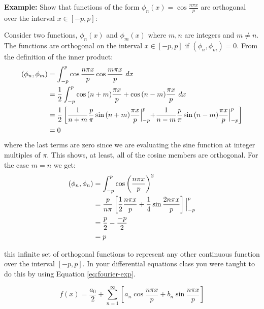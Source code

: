 \vspace{1.0cm}

\noindent\textbf{Example:} Show that functions of the form $\phi_n(x) = \cos{\frac{n\pi x}{p}}$ are orthogonal over the interval $x \in [-p,p]$:

\vspace{0.5cm}
\noindent Consider two functions, $\phi_n(x)$ and $\phi_m(x)$ where $m,n$ are integers and $m \ne n$.  The functions are orthogonal on the interval $x\in [-p,p]$ if $(\phi_n,\phi_m) = 0$.  From the definition of the inner product:
\begin{align*}
(\phi_n,\phi_m) &= \int_{-p}^{p} \cos{\frac{n \pi x}{p}} \cos{\frac{m \pi x}{p}} \ dx \\
&= \frac{1}{2}\int_{-p}^{p} \cos{(n+m)\frac{\pi x}{p}} + \cos{(n-m)\frac{\pi x}{p}} \ dx \\
&= \frac{1}{2} \left[\frac{1}{n+m} \frac{p}{\pi}\sin{(n+m)\frac{\pi x}{p}}\Bigl|_{-p}^{p} + \frac{1}{n-m}\frac{p}{\pi}\sin{(n-m)\frac{\pi x}{p}}\Bigl|_{-p}^{p} \right] \\
&=0
\end{align*}
where the last terms are zero since we are evaluating the sine function at integer multiples of $\pi$.  This shows, at least, all of the cosine members are orthogonal.  For the case $m=n$ we get:
\begin{align*}
\left(\phi_n,\phi_n \right) &= \int_{-p}^{p} \cos{\left(\frac{n \pi x}{p} \right)}^2 \\
&= \frac{p}{n \pi} \left[\frac{1}{2}\frac{n \pi x}{p} + \frac{1}{4} \sin{\frac{2 n \pi x}{p}} \right]\Bigl|_{-p}^{p} \\
&= \frac{p}{2} - \frac{-p}{2} \\
&= p
\end{align*}

 this infinite set of orthogonal functions to represent any other continuous function over the interval $[-p,p]$.  In your differential equations class you were taught to do this by using Equation \ref{eq:fourier-exp}.

\begin{equation}
f(x) = \frac{a_0}{2} + \sum\limits_{n=1}^{\infty}\left[a_n \cos{\frac{n \pi x}{p}} + b_n \sin{\frac{n \pi x}{p}} \right]
\label{eq:fourier-exp}
\end{equation}
